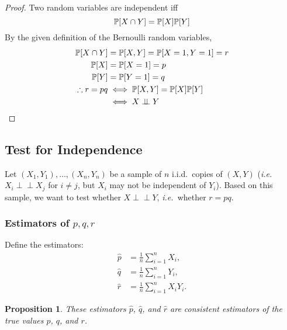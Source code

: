 \documentclass[letterpaper, reqno]{amsart}
\newtheorem{prop}{Proposition}[section]
\numberwithin{equation}{section}
\newcommand{\ie}{\emph{i.e.\ }}
\newcommand{\Prob}[1]{\mathbb{P}\mleft[#1\mright]}
\newcommand{\indep}{\perp \!\!\! \perp}  %
\newcommand{\iid}{i.i.d.}
\newcommand{\sumi}[2]{\sum_{#1=1}^{#2}}
\newcommand{\avg}[2]{\frac{1}{#2}\sumi{#1}{#2}}
\newcommand{\phat}{\hat{p}}
\newcommand{\qhat}{\hat{q}}
\newcommand{\rhat}{\hat{r}}
\begin{document}
\begin{proof}
  Two random variables are independent iff 
  \begin{equation}
    \Prob{X \cap Y} = \Prob{X}\Prob{Y} \label{eq:indep}
  \end{equation}
  By the given definition of the Bernoulli random variables,
  \begin{align*}
    \Prob{X \cap Y} &= \Prob{X, Y} = \Prob{X=1, Y=1} = r \\
    \Prob{X} &= \Prob{X=1} = p \\
    \Prob{Y} &= \Prob{Y=1} = q \\
    \therefore r = pq &\iff \Prob{X,Y} = \Prob{X}\Prob{Y} \\
    &\iff X \indep Y  \qedhere
  \end{align*}
\end{proof}

\subsection{Test for Independence}
Let $(X_1, Y_1), \dots, (X_n, Y_n)$ be a sample of $n$ \iid\ copies of $(X, Y)$
(\ie $X_i \indep X_j$ for $i \ne j$, but $X_i$ may not be independent of $Y_i$).
Based on this sample, we want to test whether $X \indep Y$, \ie whether $r = pq$.

\subsubsection{Estimators of $p, q, r$}
Define the estimators:
\begin{align*}
  \phat &= \avg{i}{n} X_i, \\
  \qhat &= \avg{i}{n} Y_i, \\
  \rhat &= \avg{i}{n} X_i Y_i.
\end{align*}

\begin{prop}
  These estimators $\phat$, $\qhat$, and $\rhat$ are consistent estimators of
  the true values $p$, $q$, and $r$.
\end{prop}
\end{document}
